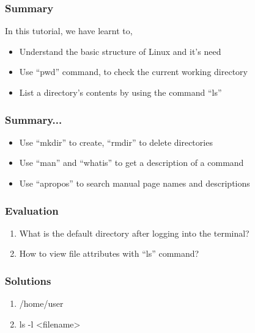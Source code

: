 \documentclass[17pt,compress]{beamer}
\begin{document}
\begin{frame}
\frametitle{Summary}
\label{sec-8}

  In this tutorial, we have learnt to,


\begin{itemize}
\item Understand the basic structure of Linux and it's need
\item Use ``pwd'' command, to check the current working directory
\item List a directory's contents by using the command ``ls''

\end{itemize}
\end{frame}

\begin{frame}
\frametitle{Summary...}
\label{sec-9}
\begin{itemize}
\item Use ``mkdir'' to create, ``rmdir'' to delete directories
\item Use ``man'' and ``whatis'' to get a description of a command
\item Use ``apropos'' to search manual page names and descriptions
\end{itemize}
\end{frame}

\begin{frame}[fragile]
\frametitle{Evaluation}
\label{sec-10}


\begin{enumerate}
\item What is the default directory after logging into the terminal?
\vspace{8pt}
\item How to view file attributes with ``ls'' command? 
\end{enumerate}
\end{frame}
\begin{frame}
\frametitle{Solutions}
\label{sec-11}


\begin{enumerate}
\item /home/user
\vspace{15pt}
\item ls -l <filename>
\end{enumerate}
\end{frame}
\end{document}
